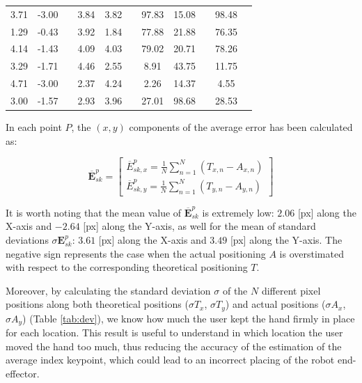 \documentclass[a4paper, 10 pt, conference]{ieeeconf}      %
\begin{document}
\begin{table}[h!]
\begin{adjustbox}{max width=\columnwidth}
\begin{tabular}{@{}ccccclccccc@{}}
			3.71                    & -3.00                  &  & 3.84                  & 3.82                  &  & 97.83                  & 15.08                 &  & 98.48 \\
			1.29                    & -0.43                  &  & 3.92                  & 1.84                  &  & 77.88                  & 21.88                 &  & 76.35   \\
			4.14                    & -1.43                  &  & 4.09                  & 4.03                  &  & 79.02                  & 20.71                 &  & 78.26  \\
			3.29                    & -1.71                  &  & 4.46                  & 2.55                  &  & 8.91                    & 43.75                 &  & 11.75  \\
			4.71                    & -3.00                  &  & 2.37                  & 4.24                  &  & 2.26                    & 14.37                 &  & 4.55  \\
			3.00                    & -1.57                  &  & 2.93                  & 3.96                  &  & 27.01                  & 98.68                 &  & 28.53 \\ \bottomrule
		\end{tabular}%
	\end{adjustbox}
\end{table}

In each point $P$, the $(x, y)$ components of the average error has been calculated as:

\begin{equation}
\overline{\mathbf{E}}^p_{sk} = \begin{bmatrix}
\overline{E}^p_{sk,x}  = \frac{1}{N}\sum_{n=1}^{N} (T_{x,n} - A_{x,n}) \\
\overline{E}^p_{sk,y} = \frac{1}{N}\sum_{n=1}^{N} (T_{y,n} - A_{y,n})
\end{bmatrix}
\end{equation}

It is worth noting that the mean value of $\overline{\mathbf{E}}^p_{sk}$ is extremely low: $2.06$ [px] along the X-axis and $-2.64$ [px] along the Y-axis, as well for the mean of standard deviations $\sigma{\mathbf{E}}^p_{sk}$: $3.61$ [px] along the X-axis and $3.49$ [px] along the Y-axis. The negative sign represents the case when the actual positioning $A$ is overstimated with respect to the corresponding theoretical positioning $T$.

Moreover, by calculating the standard deviation $\sigma$ of the $N$ different pixel positions along both theoretical positions ($\sigma T_x$, $\sigma T_y$) and actual positions ($\sigma A_x$, $\sigma A_y$) (Table \ref{tab:dev}), we know how much the user kept the hand firmly in place for each location. This result is useful to understand in which location the user moved the hand too much, thus reducing the accuracy of the estimation of the average index keypoint, which could lead to an incorrect placing of the robot end-effector.
\end{document}
